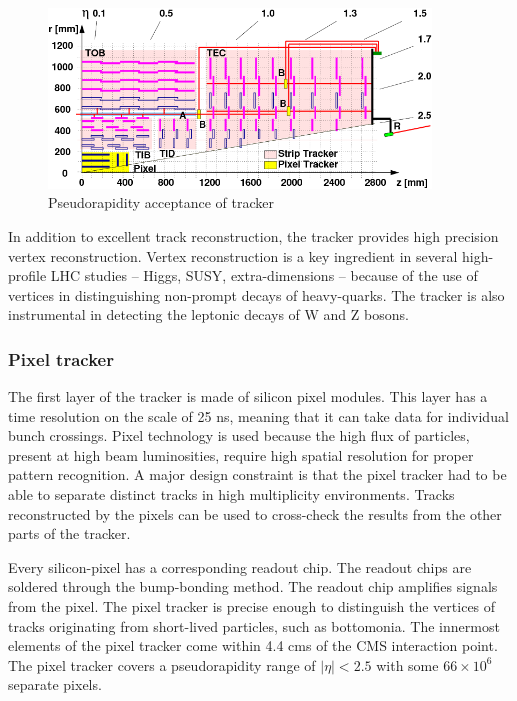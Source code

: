 \begin{figure}[]
\begin{centering}
\includegraphics[width=4in]{Chapter3/importfigs/cms_cft_09_003_fig1.png}
\par\end{centering}
\caption{Pseudorapidity acceptance of tracker \cite{Chatrchyan:2009sr} \label{fig:trackerYZ}}
\end{figure}

In addition to excellent track reconstruction, the tracker provides high precision vertex reconstruction. Vertex reconstruction is a key ingredient in several high-profile LHC studies -- Higgs, SUSY, extra-dimensions -- because of the use of vertices in distinguishing non-prompt decays of heavy-quarks. The tracker is also instrumental in detecting the leptonic decays of W and Z bosons. 

\subsubsection{Pixel tracker}

The first layer of the tracker is made of silicon pixel modules. This layer has a time resolution on the scale of 25 ns, meaning that it can take data for individual bunch crossings. Pixel technology is used because the high flux of particles, present at high beam luminosities, require high spatial resolution for proper pattern recognition. A major design constraint is that the pixel tracker had to be able to separate distinct tracks in high multiplicity environments. Tracks reconstructed by the pixels can be used to cross-check the results from the other parts of the tracker. 

Every silicon-pixel has a corresponding readout chip. The readout chips are soldered through the bump-bonding method. The readout chip amplifies signals from the pixel. The pixel tracker is precise enough to distinguish the vertices of tracks originating from short-lived particles, such as bottomonia. The innermost elements of the pixel tracker come within 4.4 cms of the CMS interaction point. The pixel tracker covers a pseudorapidity range of $|\eta|<2.5$ with some $66 \times 10^6$ separate pixels.

